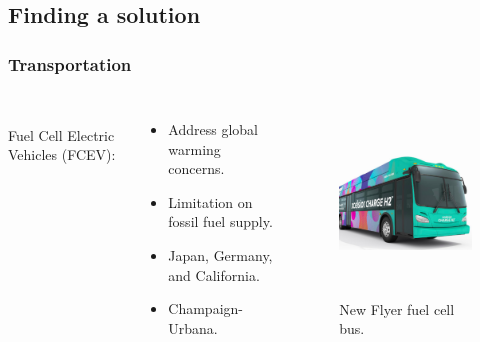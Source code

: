 \subsection{Finding a solution}
\begin{frame}
\frametitle{Transportation}
\begin{columns}
	\\
    Fuel Cell Electric Vehicles (FCEV):
	\begin{itemize}
		\item Address global warming concerns.
		\item Limitation on fossil fuel supply.
		\item Japan, Germany, and California.
		\item Champaign-Urbana.
	\end{itemize}

	\begin{figure}[htbp!]
		\begin{center}
			\includegraphics[height=5cm]{images/bus.png}
		\end{center}
		\caption{New Flyer fuel cell bus.}
	\end{figure}
\end{columns}
\end{frame}


